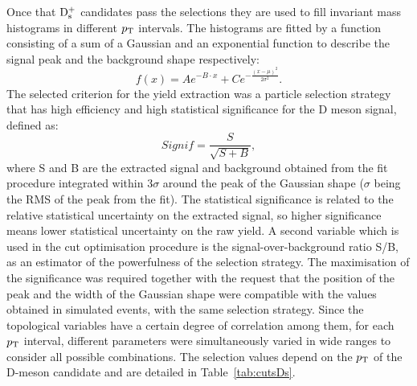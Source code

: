 Once that ${\rm D_s^+}$ candidates pass the selections they are 
used to fill invariant mass histograms in different $p_{\rm T}$ intervals.
The histograms are fitted by a function consisting of a sum of 
a Gaussian and an exponential function to describe the signal peak and 
the background shape respectively:
\begin{equation}
f(x)= Ae^{-B\cdot x}+Ce^{-\frac{(x-\mu)^2}{2\sigma^2}}.
\end{equation}
The selected criterion for the yield extraction was a particle selection 
 strategy that has high efficiency and high statistical 
 significance for the D meson signal, defined as:
\[
Signif = \frac{S}{\sqrt{S+B}},
\]
where S and B are the extracted signal and background obtained 
from the fit procedure integrated within 3$\sigma$ 
around the peak of the Gaussian shape ($\sigma$ being the
RMS of the peak from the fit). The statistical significance is related to the 
relative statistical uncertainty on the extracted signal, so higher 
significance means lower statistical uncertainty on the raw yield. 
A second variable which is used in the cut optimisation procedure
 is the signal-over-background ratio S/B, as 
 an estimator of the powerfulness of the selection strategy. 
 The maximisation of the significance was required together
  with the request that the position of the peak and the width 
  of the Gaussian shape were compatible with the values
   obtained in simulated events, with the same selection strategy.
Since the topological variables have a certain degree of correlation among them, 
for each $p_{\rm T}$ interval, different parameters 
were simultaneously varied in wide ranges to consider all possible combinations. 
The selection values depend on the $p_{\rm T}$ of the D-meson candidate and 
are detailed in Table~\ref{tab:cutsDs}.
